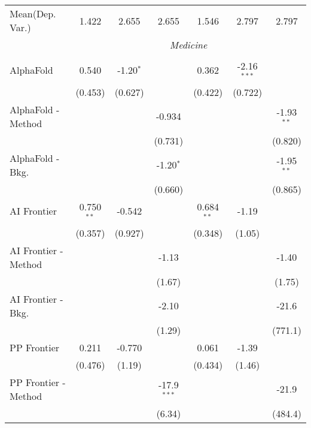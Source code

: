 \begin{tabular}{lcccccc}
Mean(Dep. Var.) & 1.422 & 2.655 & 2.655 & 1.546 & 2.797 & 2.797 \\
 & \multicolumn{6}{c}{\textit{Medicine}} \\ \\
   AlphaFold            & 0.540        & -1.20$^{*}$ &               & 0.362        & -2.16$^{***}$ &   \\   
                        & (0.453)      & (0.627)     &               & (0.422)      & (0.722)       &   \\   
   AlphaFold - Method   &              &             & -0.934        &              &               & -1.93$^{**}$\\   
                        &              &             & (0.731)       &              &               & (0.820)\\   
   AlphaFold - Bkg.     &              &             & -1.20$^{*}$   &              &               & -1.95$^{**}$\\   
                        &              &             & (0.660)       &              &               & (0.865)\\   
   AI Frontier          & 0.750$^{**}$ & -0.542      &               & 0.684$^{**}$ & -1.19         &   \\   
                        & (0.357)      & (0.927)     &               & (0.348)      & (1.05)        &   \\   
   AI Frontier - Method &              &             & -1.13         &              &               & -1.40\\   
                        &              &             & (1.67)        &              &               & (1.75)\\   
   AI Frontier - Bkg.   &              &             & -2.10         &              &               & -21.6\\   
                        &              &             & (1.29)        &              &               & (771.1)\\   
   PP Frontier          & 0.211        & -0.770      &               & 0.061        & -1.39         &   \\   
                        & (0.476)      & (1.19)      &               & (0.434)      & (1.46)        &   \\   
   PP Frontier - Method &              &             & -17.9$^{***}$ &              &               & -21.9\\   
                        &              &             & (6.34)        &              &               & (484.4)\\   

\end{tabular}
